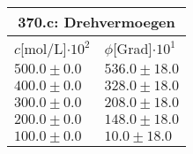 \documentclass{article}
\begin{document}
\begin{tabular}{|p{3cm}|p{3cm}|}
\hline
\multicolumn{2}{|c|}{370.c: Drehvermoegen}\\
\hline
$c$[mol/L]$\cdot 10^{2}$&$\phi$[Grad]$\cdot 10^{1}$\\
\hline
$500.0\pm0.0$&$536.0\pm 18.0$\\
$400.0\pm0.0$&$328.0\pm 18.0$\\
$300.0\pm0.0$&$208.0\pm 18.0$\\
$200.0\pm0.0$&$148.0\pm 18.0$\\
$100.0\pm0.0$&$10.0\pm 18.0$\\
\hline
\end{tabular}
\end{document}
